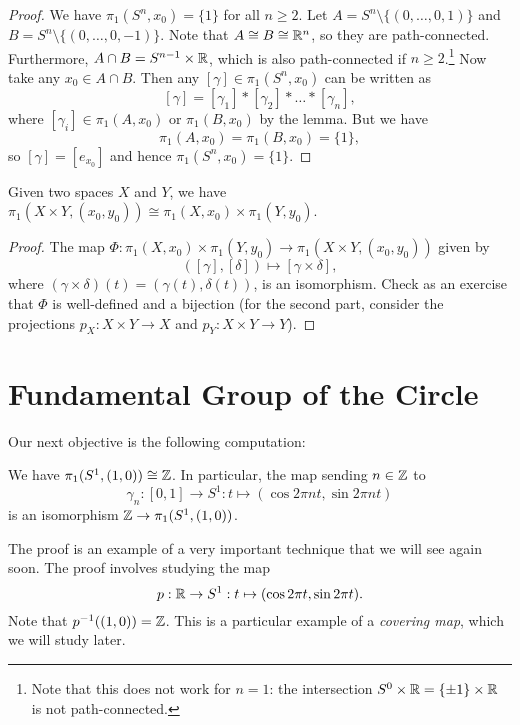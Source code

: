 \begin{proof}
  We have $\pi_1(S^n, x_0) = \{1\}$ for all $n \ge 2$.
  Let $A = S^n \setminus \{(0, \dots, 0, 1)\}$ and
  $B = S^n \setminus \{(0, \dots, 0, -1)\}$.
  Note that $A \cong B \cong \mathbb{R}^n$, so they are path-connected.
  Furthermore, $A \cap B = S^{n - 1} \times \mathbb{R}$,
  which is also path-connected if $n \ge 2$.\footnote{Note that this does not work for $n = 1$: the intersection $S^0 \times \mathbb{R} = \{\pm 1\} \times \mathbb{R}$ is not
  path-connected.}
  Now take any $x_0 \in A \cap B$. Then any
  $[\gamma] \in \pi_1(S^n, x_0)$ can be written as
  \[
    [\gamma] = [\gamma_1] * [\gamma_2] * \dots * [\gamma_n],
  \]
  where $[\gamma_i] \in \pi_1(A, x_0)$ or
  $\pi_1(B, x_0)$ by the lemma. But we have
  \[
    \pi_1(A, x_0) = \pi_1(B, x_0) = \{1\},
  \]
  so $[\gamma] = [e_{x_0}]$ and hence
  $\pi_1(S^n, x_0) = \{1\}$.
\end{proof}

\begin{theorem}
  Given two spaces $X$ and $Y$, we have
  $\pi_1(X \times Y, (x_0, y_0)) \cong \pi_1(X, x_0) \times \pi_1(Y, y_0)$.
\end{theorem}

\begin{proof}
  The map $\Phi : \pi_1(X, x_0) \times \pi_1(Y, y_0) \to \pi_1(X \times Y, (x_0, y_0))$
  given by
  \[
    ([\gamma], [\delta]) \mapsto [\gamma \times \delta],
  \]
  where $(\gamma \times \delta)(t) = (\gamma(t), \delta(t))$,
  is an isomorphism. Check as an exercise that
  $\Phi$ is well-defined and a bijection (for the
  second part, consider the projections $p_X : X \times Y \to X$
  and $p_Y : X \times Y \to Y$).
\end{proof}

\section{Fundamental Group of the Circle}

Our next objective is the following computation:
\begin{theorem}\label{thm:fund-group-circle}
  We have $\pi_1(S^1, (1, 0)) \cong \mathbb{Z}$. In particular,
  the map sending $n \in \mathbb{Z}$ to
  \[
    \gamma_n : [0, 1] \to S^1 : t \mapsto (\cos 2\pi nt, \sin 2\pi nt)
  \]
  is an isomorphism $\mathbb{Z} \to \pi_1(S^1, (1, 0))$.
\end{theorem}

\begin{remark}
  The proof is an example of a very important
  technique that we will see again soon. The proof
  involves studying the map
  \[
    p : \mathbb{R} \to S^1 : t \mapsto (\cos 2\pi t, \sin 2\pi t).
  \]
  Note that $p^{-1}((1, 0)) = \mathbb{Z}$. This is a
  particular example of a \emph{covering map}, which we
  will study later.
\end{remark}

